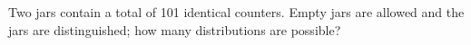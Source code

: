 Two jars contain a total of 101 identical counters. Empty jars are allowed and the jars are distinguished; how many distributions are possible?
